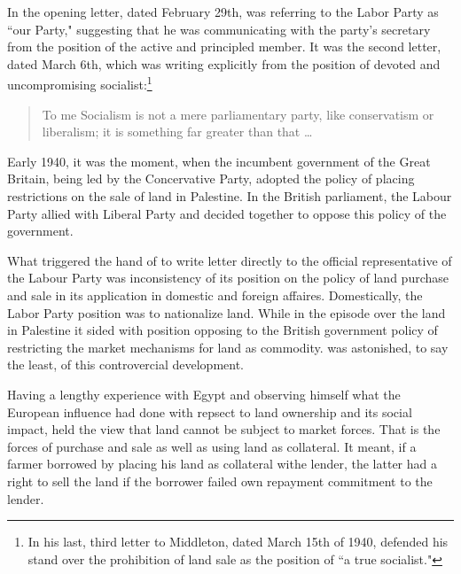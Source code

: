 In the opening letter, dated February 29th, \citeauthor{innes1940} was referring to the Labor Party as ``our Party," suggesting that he was communicating with the party's secretary from the position of the active and principled member. It was the second letter, dated March 6th, which \citeauthor{innes1940} was writing explicitly from the position of devoted and uncompromising socialist:\footnote{In his last, third letter to Middleton, dated March 15th of 1940, \citeauthor{innes1940} defended his stand over the prohibition of land sale as the position of ``a true socialist."}

\begin{quote}
To me Socialism is not a mere parliamentary party, like conservatism or liberalism; it is something far greater than that \dots ~\citep{innes1940}
\end{quote}

Early 1940, it was the moment, when the incumbent government of the Great Britain, being led by the Concervative Party, adopted the policy of placing restrictions on the sale of land in Palestine. In the British parliament, the Labour Party allied with Liberal Party and decided together to oppose this policy of the government. 

What triggered the hand of \citeauthor{innes1940} to write letter directly to the official representative of the Labour Party was inconsistency of its position on the policy of land purchase and sale in its application in domestic and foreign affaires. Domestically, the Labor Party position was to nationalize land. While in the episode over the land in Palestine it sided with position opposing to the British government policy of restricting the market mechanisms for land as commodity. \citeauthor{innes1940} was astonished, to say the least, of this controvercial development.

Having a lengthy experience with Egypt and observing himself what the European influence had done with repsect to land ownership and its social impact, \citeauthor{innes1940} held the view that land cannot be subject to market forces. That is the forces of purchase and sale as well as using land as collateral. It meant, if a farmer borrowed by placing his land as collateral withe lender, the latter had a right to sell the land if the borrower failed own repayment commitment to the lender. 

